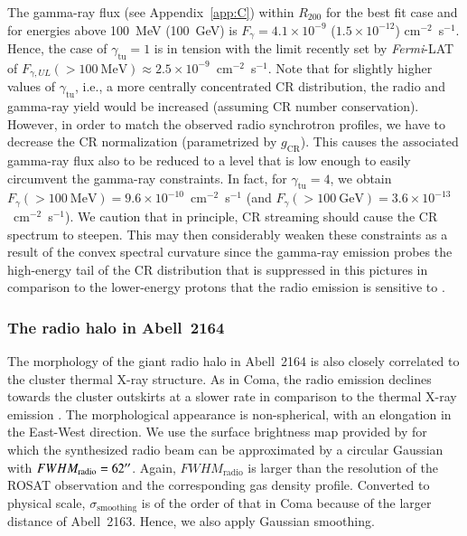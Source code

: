 \documentclass[traditabstract]{aa}
\newcommand{\rmn}{\mathrm}
\begin{document}
The gamma-ray flux (see Appendix~\ref{app:C}) within $R_{200}$ for the best fit
case and for energies above 100~MeV (100~GeV) is $F_{\gamma} = 4.1 \times
10^{-9}$ ($1.5 \times 10^{-12}$) cm$^{-2}$~s$^{-1}$. Hence, the case of
$\gamma_{\rmn{tu}} = 1$ is in tension with the limit recently set by
\emph{Fermi}-LAT \citep{2012AAS...21920701Z} of $F_{\gamma, UL} (>100~\rmn{MeV})
\approx 2.5 \times 10^{-9}$~cm$^{-2}$~s$^{-1}$.  Note that for slightly higher
values of $\gamma_{\rmn{tu}}$, i.e., a more centrally concentrated CR
distribution, the radio and gamma-ray yield would be increased (assuming CR
number conservation). However, in order to match the observed radio synchrotron
profiles, we have to decrease the CR normalization (parametrized by
$g_{\rmn{CR}}$). This causes the associated gamma-ray flux also to be reduced to
a level that is low enough to easily circumvent the gamma-ray constraints. In
fact, for $\gamma_{\rmn{tu}} = 4$, we obtain $F_{\gamma} (>100~\rmn{MeV}) = 9.6
\times 10^{-10}$~cm$^{-2}$~s$^{-1}$ (and $F_{\gamma} (>100~\rmn{GeV}) = 3.6
\times 10^{-13}$~cm$^{-2}$~s$^{-1}$). We caution that in principle, CR streaming
should cause the CR spectrum to steepen. This may then considerably weaken these
constraints as a result of the convex spectral curvature since the gamma-ray
emission probes the high-energy tail of the CR distribution that is suppressed
in this pictures in comparison to the lower-energy protons that the radio
emission is sensitive to \citep[see][for an extended discussion of this
point]{2011arXiv1111.5544M}.


\subsubsection{The radio halo in Abell~2164}

The morphology of the giant radio halo in Abell~2164 is also closely correlated
to the cluster thermal X-ray structure. As in Coma, the radio emission declines
towards the cluster outskirts at a slower rate in comparison to the thermal
X-ray emission \citep{2001A&A...373..106F}. The morphological appearance is
non-spherical, with an elongation in the East-West direction. We use the surface
brightness map provided by \citet{2009A&A...499..679M} for which the synthesized
radio beam can be approximated by a circular Gaussian with
$FWHM_{\rmn{radio}}=62\arcsec$.  Again, $FWHM_{\rmn{radio}}$ is larger than the
resolution of the ROSAT observation and the corresponding gas density
profile. Converted to physical scale, $\sigma_{\rmn{smoothing}}$ is of the order
of that in Coma because of the larger distance of Abell~2163. Hence, we also apply
Gaussian smoothing.
\end{document}
